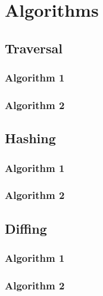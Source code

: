 


\section{Algorithms}






\subsection{Traversal}


\subsubsection{Algorithm 1}

\subsubsection{Algorithm 2}


\subsection{Hashing}


\subsubsection{Algorithm 1}

\subsubsection{Algorithm 2}


\subsection{Diffing}


\subsubsection{Algorithm 1}

\subsubsection{Algorithm 2}